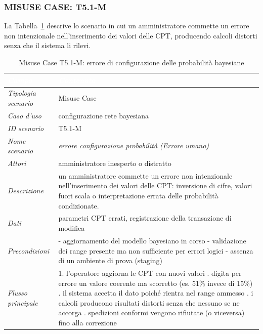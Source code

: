 \subsubsection*{MISUSE CASE: T5.1-M}
La Tabella~\ref{tab:t51m} descrive lo scenario in cui un amministratore commette un errore non intenzionale nell'inserimento dei valori delle CPT, producendo calcoli distorti senza che il sistema li rilevi.
\begin{longtable}{| >{\columncolor{misuseCol}}p{} | p{} |}
\caption{Misuse Case T5.1-M: errore di configurazione delle probabilità bayesiane}\label{tab:t51m}\\
\hline
\rowcolor{misuseHeader} \textcolor{white}{\textit{Campo}} & \textcolor{white}{\textit{Contenuto}} \\
\hline
\textit{Tipologia scenario} & Misuse Case \\
\hline
\textit{Caso d'uso} & configurazione rete bayesiana \\
\hline
\textit{ID scenario} & T5.1-M \\
\hline
\textit{Nome scenario} & \textit{errore configurazione probabilità (Errore umano)} \\
\hline
\textit{Attori} & amministratore inesperto o distratto \\
\hline
\textit{Descrizione} & un amministratore commette un errore non intenzionale nell'inserimento dei valori delle CPT: inversione di cifre, valori fuori scala o interpretazione errata delle probabilità condizionate. \\
\hline
\textit{Dati} & parametri CPT errati, registrazione della transazione di modifica \\
\hline
\textit{Precondizioni} & - aggiornamento del modello bayesiano in corso \newline - validazione dei range presente ma non sufficiente per errori logici \newline - assenza di un ambiente di prova (staging) \\
\hline
\textit{Flusso principale} & 1. l'operatore aggiorna le CPT con nuovi valori \newline 2. digita per errore un valore coerente ma scorretto (es. 51\% invece di 15\%) \newline 3. il sistema accetta il dato poiché rientra nel range ammesso \newline 4. i calcoli producono risultati distorti senza che nessuno se ne accorga \newline 5. spedizioni conformi vengono rifiutate (o viceversa) fino alla correzione \\

\end{longtable}
